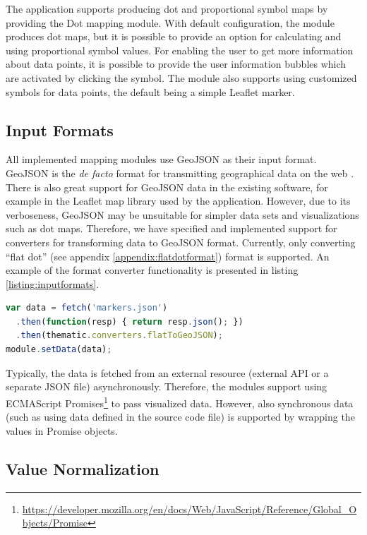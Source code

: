 The application supports producing dot and proportional symbol maps by providing the Dot mapping module. With default configuration, the module produces dot maps, but it is possible to provide an option for calculating and using proportional symbol values. For enabling the user to get more information about data points, it is possible to provide the user information bubbles which are activated by clicking the symbol. The module also supports using customized symbols for data points, the default being a simple Leaflet marker.

\subsection{Input Formats}

All implemented mapping modules use GeoJSON as their input format. GeoJSON is the \emph{de facto} format for transmitting geographical data on the web \citep{bostock_code_2013}. There is also great support for GeoJSON data in the existing software, for example in the Leaflet map library used by the application. However, due to its verboseness, GeoJSON may be unsuitable for simpler data sets and visualizations such as dot maps. Therefore, we have specified and implemented support for converters for transforming data to GeoJSON format. Currently, only converting ``flat dot'' (see appendix \ref{appendix:flatdotformat}) format is supported. An example of the format converter functionality is presented in listing \ref{listing:inputformats}.

\begin{lstlisting}[caption=An example code for using the flat dot input format converter.,language=JavaScript,label=listing:inputformats]
var data = fetch('markers.json')
  .then(function(resp) { return resp.json(); })
  .then(thematic.converters.flatToGeoJSON);
module.setData(data);
\end{lstlisting}

Typically, the data is fetched from an external resource (external API or a separate JSON file) asynchronously. Therefore, the modules support using ECMAScript Promises\footnote{\url{https://developer.mozilla.org/en/docs/Web/JavaScript/Reference/Global_Objects/Promise}} to pass visualized data. However, also synchronous data (such as using data defined in the source code file) is supported by wrapping the values in Promise objects.

\subsection{Value Normalization}

